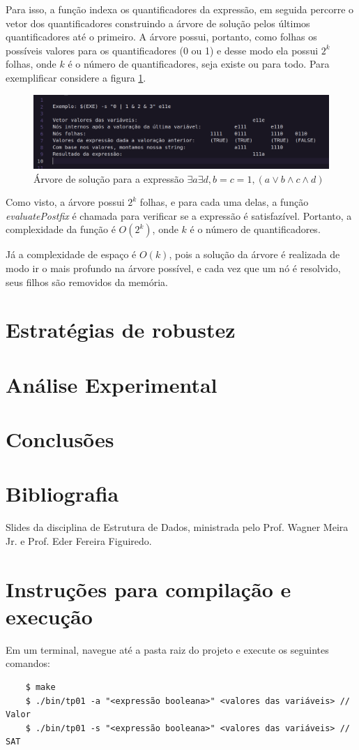\documentclass{article}
\begin{document}
Para isso, a função indexa os quantificadores da expressão, em seguida percorre o vetor dos quantificadores construindo a árvore de solução pelos últimos quantificadores até o primeiro.
A árvore possui, portanto, como folhas os possíveis valores para os quantificadores (0 ou 1) e desse modo ela possui $2^k$ folhas, onde $k$ é o número de quantificadores, seja existe ou para todo. Para exemplificar considere a figura \ref{fig:sat_tree}.

\begin{figure}
    \centering
    \includegraphics[width=\textwidth]{./sat_tree.png}
    \caption{Árvore de solução para a expressão $\exists a \exists d , b = c = 1,  (a \lor b \land c \land d)$}
    \label{fig:sat_tree}
\end{figure}

Como visto, a árvore possui $2^k$ folhas, e para cada uma delas, a função \textit{evaluatePostfix} é chamada para verificar se a expressão é satisfazível. Portanto, a complexidade da função é $O(2^k)$, onde $k$ é o número de quantificadores.

Já a complexidade de espaço é $O(k)$, pois a solução da árvore é realizada de modo ir o mais profundo na árvore possível, e cada vez que um nó é resolvido, seus filhos são removidos da memória.
\section{Estratégias de robustez}

\section{Análise Experimental}

\section{Conclusões}

\section*{Bibliografia}

Slides da disciplina de Estrutura de Dados, ministrada pelo Prof. Wagner Meira Jr. e Prof. Eder Fereira Figuiredo.


\section*{Instruções para compilação e execução}

Em um terminal, navegue até a pasta raiz do projeto e execute os seguintes comandos:

\begin{verbatim}
    $ make
    $ ./bin/tp01 -a "<expressão booleana>" <valores das variáveis> // Valor 
    $ ./bin/tp01 -s "<expressão booleana>" <valores das variáveis> // SAT
\end{verbatim}
\end{document}
